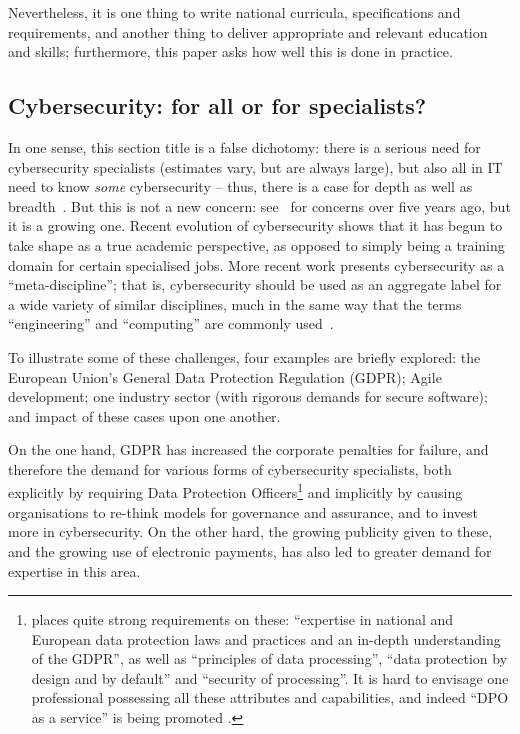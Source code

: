 \documentclass[conference]{IEEEtran}
\begin{document}
Nevertheless, it is one thing to write national curricula, specifications and requirements, and
another thing to deliver appropriate and relevant education and skills; furthermore, this paper asks how well this is done in practice.

\subsection{Cybersecurity: for all or for specialists?}

In one sense, this section title is a false dichotomy: there is a serious need for cybersecurity specialists (estimates vary, but are always large), but also all in IT need to know \emph{some} cybersecurity -- thus, there is a case for depth as well as breadth~\cite{manson+pike:2014}. But this is not a new concern: see~\cite{Parr2014a} for concerns over five years ago, but it is a growing one. Recent evolution of cybersecurity shows that it has begun to take shape as a true academic perspective, as opposed to simply being a training domain for certain specialised jobs. More recent work presents cybersecurity as a ``meta-discipline''; that is, cybersecurity should be used as an aggregate label for a wide variety of similar disciplines, much in the same way that the terms ``engineering'' and ``computing'' are commonly used~\cite{Parrishetal2018b}. 

To illustrate some of these challenges, four examples are briefly explored: the European Union's General Data Protection Regulation (GDPR); Agile development; one industry sector (with rigorous demands for secure software); and impact of these cases upon one another.

On the one hand, GDPR has increased the corporate penalties for failure, and therefore the demand for various forms of cybersecurity specialists, both explicitly by requiring Data Protection Officers\footnote{\cite{EU292016a} places quite strong requirements on these: ``expertise in national and European data protection laws and practices and an in-depth understanding of the GDPR'', as well as ``principles of data processing'', ``data protection by design and by default'' and ``security of processing''. It is hard to envisage one professional possessing all these attributes and capabilities, and indeed ``DPO as a service'' is being promoted \cite{McCreanor2018d}.} and implicitly by causing organisations to re-think models for governance and assurance, and to invest more in cybersecurity. On the other hard, the growing publicity given to these, and the growing use of electronic payments, has also led to greater demand for expertise in this area.
\end{document}
